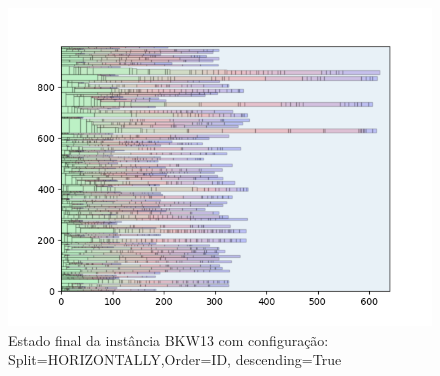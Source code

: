 \begin{figure}[H]
    \centering
    \caption[]{Estado final da instância BKW13 com configuração: Split=HORIZONTALLY,Order=ID, descending=True}
    \label{fig:bkw13-horizontally-id-true}
    \includegraphics[scale=0.5]{output/figures/bkw/bkw13/horizontally/id/true/0000}
\end{figure}